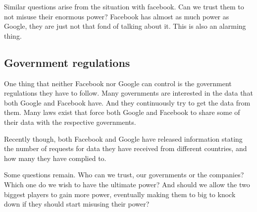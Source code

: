 Similar questions arise from the situation with facebook. Can we trust them to not misuse their enormous power? Facebook has almost as much power as Google, they are just not that fond of talking about it. This is also an alarming thing.

\subsection{Government regulations}
One thing that neither Facebook nor Google can control is the government regulations they have to follow. Many governments are interested in the data that both Google and Facebook have. And they continuously try to get the data from them. Many laws exist that force both Google and Facebook to share some of their data with the respective governments.

Recently though, both Facebook and Google have released information stating the number of requests for data they have received from different countries, and how many they have complied to.\cite{website:facebook-requests}\cite{website:google-requests}

Some questions remain. Who can we trust, our governments or the companies? Which one do we wish to have the ultimate power? And should we allow the two biggest players to gain more power, eventually making them to big to knock down if they should start misusing their power?
